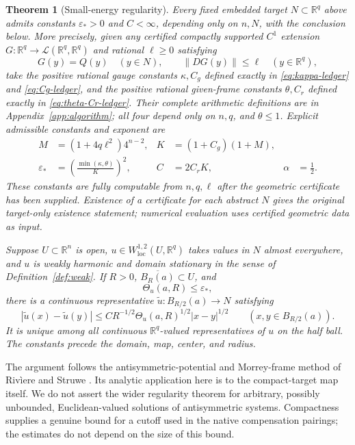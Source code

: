 \documentclass[11pt,a4paper]{article}
\numberwithin{equation}{section}
\newtheorem{theorem}{Theorem}[section]
\theoremstyle{definition}
\theoremstyle{remark}
\newcommand{\R}{\mathbb R}
\newcommand{\loc}{\mathrm{loc}}
\newcommand{\Th}{\Theta}
\newcommand{\norm}[1]{\left\lVert#1\right\rVert}
\newcommand{\cl}[1]{\overline{#1}}
\begin{document}
\begin{theorem}[Small-energy regularity]\label{thm:main}
Every fixed embedded target $N\subset\R^q$ above admits constants
$\varepsilon_*>0$ and $C<\infty$, depending only on $n,N$, with the
conclusion below.
More precisely, given any certified compactly supported $C^1$ extension
$G:\R^q\to\mathcal L(\R^q,\R^q)$ and rational $\ell\geq0$ satisfying
\[
 G(y)=Q(y)\quad(y\in N),\qquad
 \norm{DG(y)}\leq\ell\quad(y\in\R^q),
\]
take the positive rational gauge constants $\kappa,C_g$ defined exactly
in \eqref{eq:kappa-ledger} and \eqref{eq:Cg-ledger}, and the positive
rational given-frame constants $\theta,C_r$ defined exactly in
\eqref{eq:theta-Cr-ledger}. Their complete arithmetic definitions are in
Appendix~\ref{app:algorithm}; all four depend only on $n,q$, and
$\theta\leq1$. Explicit admissible constants and exponent are
\begin{align}
 M&=(1+4q\ell^2)4^{n-2},& K&=(1+C_g)(1+M),\nonumber\\
 \varepsilon_*&=\left(\frac{\min(\kappa,\theta)}K\right)^2,&
 C&=2C_rK,& \alpha&=\frac12.\label{eq:main-explicit-constants}
\end{align}
These constants are fully computable from $n,q,\ell$ after the geometric
certificate has been supplied. Existence of a certificate for each abstract
$N$ gives the original target-only existence statement; numerical evaluation
uses certified geometric data as input.

Suppose $U\subset\R^n$ is open, $u\in W^{1,2}_{\loc}(U,\R^q)$ takes
values in $N$ almost everywhere, and $u$ is weakly harmonic and domain
stationary in the sense of Definition~\ref{def:weak}. If $R>0$,
$\cl{B_R(a)}\subset U$, and
\begin{equation}\label{eq:small-energy}
 \Th_u(a,R)\leq\varepsilon_*,
\end{equation}
there is a continuous representative
$\widetilde u:B_{R/2}(a)\longrightarrow N$ satisfying
\begin{equation}\label{eq:holder-main}
 |\widetilde u(x)-\widetilde u(y)|
 \leq C R^{-1/2}\Th_u(a,R)^{1/2}|x-y|^{1/2}
 \qquad(x,y\in B_{R/2}(a)).
\end{equation}
It is unique among all continuous $\R^q$-valued representatives of $u$
on the half ball. The constants precede the domain, map, center, and radius.
\end{theorem}

The argument follows the antisymmetric-potential and Morrey-frame method
of Riv\`iere and Struwe \cite{R,RS}. Its analytic application here is to the
compact-target map itself. We do not assert the wider regularity theorem
for arbitrary, possibly unbounded, Euclidean-valued solutions of
antisymmetric systems. Compactness supplies a genuine bound for a cutoff
used in the native compensation pairings; the estimates do not depend on
the size of this bound.
\end{document}
